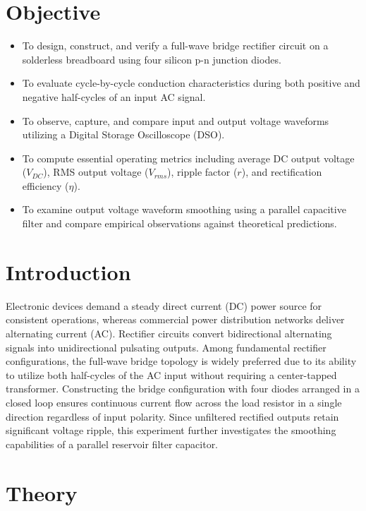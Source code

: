 \section{Objective}
\begin{itemize}
	\item To design, construct, and verify a full-wave bridge rectifier circuit on a solderless breadboard using four silicon p-n junction diodes.
	\item To evaluate cycle-by-cycle conduction characteristics during both positive and negative half-cycles of an input AC signal.
	\item To observe, capture, and compare input and output voltage waveforms utilizing a Digital Storage Oscilloscope (DSO).
	\item To compute essential operating metrics including average DC output voltage ($V_{DC}$), RMS output voltage ($V_{rms}$), ripple factor ($r$), and rectification efficiency ($\eta$).
	\item To examine output voltage waveform smoothing using a parallel capacitive filter and compare empirical observations against theoretical predictions.
\end{itemize}

\section{Introduction}
Electronic devices demand a steady direct current (DC) power source for consistent operations, whereas commercial power distribution networks deliver alternating current (AC). Rectifier circuits convert bidirectional alternating signals into unidirectional pulsating outputs. Among fundamental rectifier configurations, the full-wave bridge topology is widely preferred due to its ability to utilize both half-cycles of the AC input without requiring a center-tapped transformer. Constructing the bridge configuration with four diodes arranged in a closed loop ensures continuous current flow across the load resistor in a single direction regardless of input polarity. Since unfiltered rectified outputs retain significant voltage ripple, this experiment further investigates the smoothing capabilities of a parallel reservoir filter capacitor.

\section{Theory}

